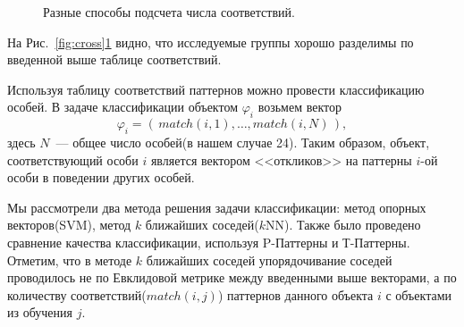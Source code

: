 \documentclass[12pt,fсeqn]{article}
\begin{document}
\begin{figure}[t]
\noindent{}
\caption{ Разные способы подсчета числа соответствий.}
\label{fig:cross_many}
\end{figure}

На Рис.~\ref{fig:cross}\ref{fig:cross_many} видно, что исследуемые группы хорошо разделимы по введенной выше таблице соответствий. 

Используя таблицу соответствий паттернов можно провести классификацию особей. В задаче классификации объектом $\varphi_i$
возьмем вектор
  $$ \varphi_i = \left(\,match(i,1), \dots, match(i,N)\,\right), $$
здесь $N$~--- общее число особей(в нашем случае 24). Таким образом, объект, соответствующий особи $i$
является вектором <<откликов>> на паттерны $i$-ой особи в поведении других особей.

Мы рассмотрели два метода решения задачи классификации: метод опорных векторов(SVM),
метод $k$ ближайших соседей($k$NN). Также было проведено сравнение качества классификации, используя 
P-Паттерны и Т-Паттерны. Отметим, что в методе $k$ ближайших соседей упорядочивание соседей
проводилось не по Евклидовой метрике между введенными выше векторами, а по количеству 
соответствий($match(i,j)$) паттернов данного объекта $i$ с объектами из обучения $j$.
\end{document}
